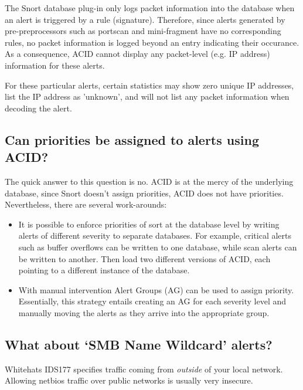 \documentclass{article}
\begin{document}
The Snort database plug-in only logs packet information into the database
when an alert is triggered by a rule (signature). Therefore, since alerts
generated by pre-preprocessors such as portscan and mini-fragment have no
corresponding rules, no packet information is logged beyond an entry
indicating their occurance. As a consequence, ACID cannot display any
packet-level (e.g. IP address) information for these alerts. 

For these particular alerts, certain statistics may show zero unique IP
addresses, list the IP address as 'unknown', and will not list any packet
information when decoding the alert. 

\subsection{Can priorities be assigned to alerts using ACID?  }

The quick answer to this question is no. ACID is at the mercy of the
underlying database, since Snort doesn't assign priorities, ACID does not
have priorities. Nevertheless, there are several work-arounds: 

\begin{itemize}
\item It is possible to enforce priorities of sort at the database level by
writing alerts of different severity to separate databases. For example,
critical alerts such as buffer overflows can be written to one database,
while scan alerts can be written to another. Then load two different versions
of ACID, each pointing to a different instance of the database. 

\item With manual intervention Alert Groups (AG) can be used to assign priority.
Essentially, this strategy entails creating an AG for each severity level and
manually moving the alerts as they arrive into the appropriate group. 
\end{itemize}

\subsection{What about `SMB Name Wildcard' alerts? }

Whitehats IDS177
specifies traffic coming from {\em outside} of your local network.  Allowing
netbios traffic over public networks is usually very insecure.
\end{document}
